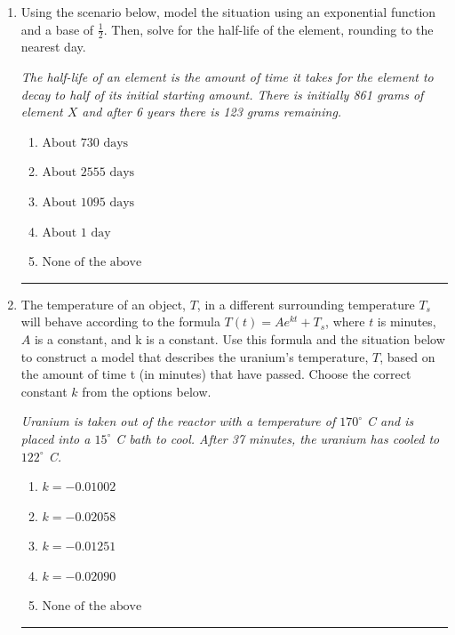 \documentclass[14pt]{extbook}
\newcommand{\litem}[1]{\item#1\hspace*{-1cm}\rule{\textwidth}{0.4pt}}
\begin{document}
\begin{enumerate}
{\begin{enumerate}[label=\Alph*.]
\end{enumerate} }
\litem{
Using the scenario below, model the situation using an exponential function and a base of $\frac{1}{2}$. Then, solve for the half-life of the element, rounding to the nearest day.
\begin{center}
    \textit{ The half-life of an element is the amount of time it takes for the element to decay to half of its initial starting amount. There is initially 861 grams of element $X$ and after 6 years there is 123 grams remaining. }
\end{center}
\begin{enumerate}[label=\Alph*.]
\item \( \text{About } 730 \text{ days} \)
\item \( \text{About } 2555 \text{ days} \)
\item \( \text{About } 1095 \text{ days} \)
\item \( \text{About } 1 \text{ day} \)
\item \( \text{None of the above} \)

\end{enumerate} }
\litem{
The temperature of an object, $T$, in a different surrounding temperature $T_s$ will behave according to the formula $T(t) = Ae^{kt} + T_s$, where $t$ is minutes, $A$ is a constant, and k is a constant. Use this formula and the situation below to construct a model that describes the uranium's temperature, $T$, based on the amount of time t (in minutes) that have passed. Choose the correct constant $k$ from the options below.
\begin{center}
    \textit{ Uranium is taken out of the reactor with a temperature of $170^{\circ}$ C and is placed into a $15^{\circ}$ C bath to cool. After 37 minutes, the uranium has cooled to $122^{\circ}$ C. }
\end{center}
\begin{enumerate}[label=\Alph*.]
\item \( k = -0.01002 \)
\item \( k = -0.02058 \)
\item \( k = -0.01251 \)
\item \( k = -0.02090 \)
\item \( \text{None of the above} \)


\end{enumerate}}
\end{enumerate}
\end{document}

